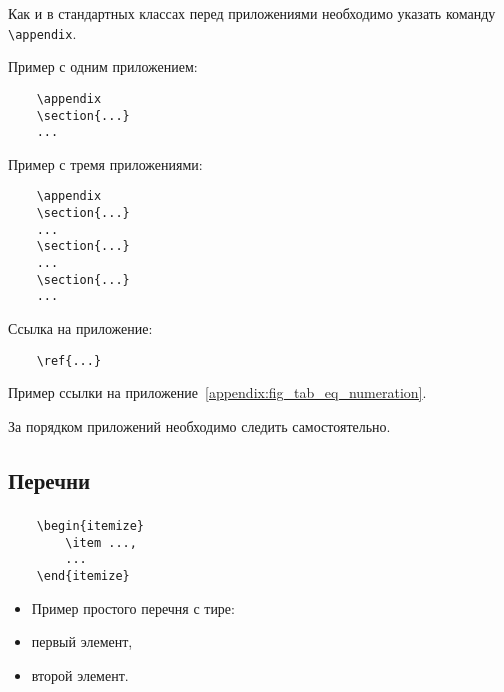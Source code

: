 \documentclass[14pt, a4paper, titlepage]{extarticle}
\renewcommand{\thesection}{\Asbuk{section}}
\let\oldsec\section
\renewcommand{\section}{
		\clearpage
		\phantomsection
		\refstepcounter{section}
		\setcounter{figure}{0} %
		\setcounter{table}{0} %
		\setcounter{equation}{0} %
		\addcontentsline{toc}{section}{\appendixname~\thesection}
		\oldsec*} %
\begin{document}
Как и в стандартных классах перед приложениями необходимо указать команду \verb"\appendix".

Пример с одним приложением:
\begin{verbatim}
	\appendix
	\section{...}
	...
\end{verbatim}

Пример с тремя приложениями:
\begin{verbatim}
	\appendix
	\section{...}
	...
	\section{...}
	...
	\section{...}
	...
\end{verbatim}

Ссылка на приложение:
\begin{verbatim}
	\ref{...}
\end{verbatim}

Пример ссылки на приложение~\ref{appendix:fig_tab_eq_numeration}.

За порядком приложений необходимо следить самостоятельно.

\subsection{Перечни}

\subsubsection{}

\begin{verbatim}
	\begin{itemize}
		\item ...,
		...
	\end{itemize}
\end{verbatim}

\begin{itemize}
	\item[] Пример простого перечня с тире:
	\item первый элемент,
	\item второй элемент.
\end{itemize}
\end{document}
